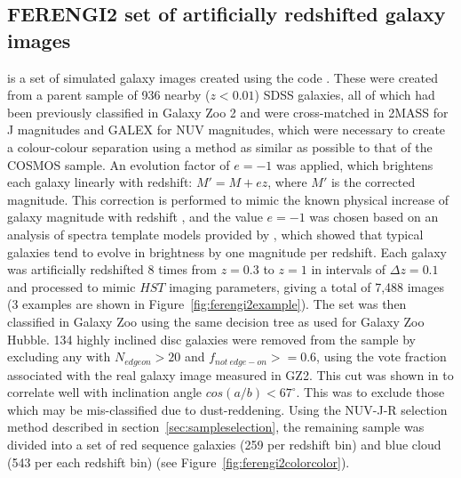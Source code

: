 \documentclass[useAMS,usenatbib]{mn2e}
\begin{document}
\subsection{FERENGI2 set of artificially redshifted galaxy images}
\label{ssec:ferengi}
 is a set of simulated galaxy images created using the \ferengi{} code \citep{Barden2008}. These were created from a parent sample of 936 nearby ($z<0.01$) SDSS galaxies, all of which had been previously classified in Galaxy Zoo 2 and were cross-matched in 2MASS \citep{Skrutskie2006} for J magnitudes and GALEX \citep{Martin2005} for NUV magnitudes, which were necessary to create a colour-colour separation using a method as similar as possible to that of the COSMOS sample.  An evolution factor of $e=-1$ was applied, which brightens each galaxy linearly with redshift: $M' = M + ez$, where $M'$ is the corrected magnitude. This correction is performed to mimic the known physical increase of galaxy magnitude with redshift \citep{Lilly1998,Loveday2011}, and the value $e=-1$ was chosen based on an analysis of spectra template models provided by \citet{Brinchmann2004a}, which showed that typical galaxies tend to evolve in brightness by one magnitude per redshift. Each galaxy was artificially redshifted 8 times from $z=0.3$ to $z=1$ in intervals of $\Delta z = 0.1$ and processed to mimic $HST$ imaging parameters, giving a total of 7,488 images (3 examples are shown in Figure~\ref{fig:ferengi2example}).  The set was then classified in Galaxy Zoo using the same decision tree as used for Galaxy Zoo Hubble. 134 highly inclined disc galaxies were removed from the sample by excluding any with $N_{edgeon}>20$ and $f_{not~edge-on}>=0.6$, using the vote fraction associated with the real galaxy image measured in GZ2. This cut was shown in \citet{Galloway2015} to correlate well with inclination angle $cos(a/b)<67^\circ$. This was to exclude those which may be mis-classified due to dust-reddening.  Using the NUV-J-R selection method described in section~\ref{sec:sampleselection}, the remaining sample was divided into a set of red sequence galaxies (259 per redshift bin) and blue cloud (543 per each redshift bin) (see Figure~\ref{fig:ferengi2colorcolor}).
\end{document}
